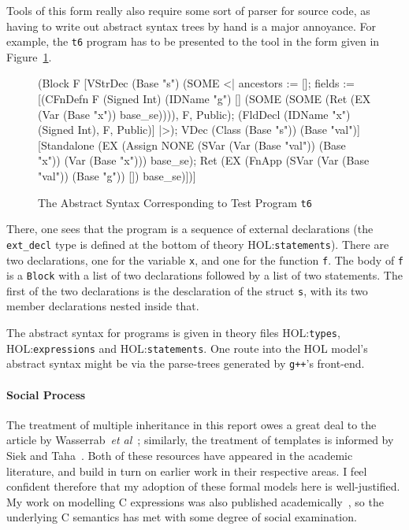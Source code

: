\documentclass[11pt]{article}
\newcommand{\HOLfile}[1]{HOL:\texttt{#1}}
\begin{document}
Tools of this form really also require some sort of parser for \cpp{}
source code, as having to write out abstract syntax trees by hand is a
major annoyance.  For example, the \texttt{t6} program has to be
presented to the tool in the form given in
Figure~\ref{fig:translated-t6}.
\begin{figure}
\begin{stdrule}
    [Decl (VDec (Signed Int) (Base "x"));
     FnDefn (Signed Int) (Base "f") []
       (Block F
          [VStrDec (Base "s")
             (SOME
               <| ancestors := [];
                  fields := [(CFnDefn F (Signed Int) (IDName "g") []
                                (SOME
                                  (SOME (Ret (EX (Var (Base "x"))
                                                 base_se)))),
                                F, Public);
                             (FldDecl (IDName "x") (Signed Int),
                              F, Public)]
               |>);
           VDec (Class (Base "s")) (Base "val")]
          [Standalone
             (EX
              (Assign NONE
                      (SVar (Var (Base "val")) (Base "x"))
                      (Var (Base "x")))
              base_se);
           Ret (EX (FnApp (SVar (Var (Base "val")) (Base "g")) [])
                      base_se)])]
\end{stdrule}
\caption{The Abstract Syntax Corresponding to Test Program
  \texttt{t6}}
\label{fig:translated-t6}
\end{figure}
There, one sees that the program is a sequence of external
declarations (the \texttt{ext_decl} type is defined at the bottom of
theory \HOLfile{statements}).  There are two declarations, one for the
variable \texttt{x}, and one for the function \texttt{f}.  The body of
\texttt{f} is a \texttt{Block} with a list of two declarations
followed by a list of two statements.  The first of the two
declarations is the desclaration of the struct \texttt{s}, with its
two member declarations nested inside that.

The abstract syntax for \cpp{} programs is given in theory files
\HOLfile{types}, \HOLfile{expressions} and \HOLfile{statements}.  One
route into the HOL model's abstract syntax might be via the
parse-trees generated by \texttt{g++}'s front-end.

\paragraph{Social Process}
The treatment of multiple inheritance in this report owes a great deal
to the article by Wasserrab~\emph{et
  al}~\cite{wasserrab-nst-OOPSLA06}; similarly, the treatment of
templates is informed by Siek and Taha~\cite{DBLP:conf/ecoop/SiekT06}.
Both of these resources have appeared in the academic literature, and
build in turn on earlier work in their respective areas.  I feel
confident therefore that my adoption of these formal models here is
well-justified.  My work on modelling C expressions was also published
academically~\cite{norrish99}, so the underlying C semantics has met
with some degree of social examination.
\end{document}

